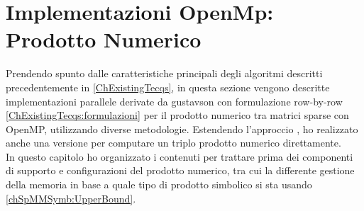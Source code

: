 \chapter{Implementazioni OpenMp: Prodotto Numerico}
\label{Chapter3}





Prendendo spunto dalle caratteristiche principali degli algoritmi descritti precedentemente in \ref{ChExistingTecqs}, 
in questa sezione vengono descritte implementazioni parallele derivate da gustavson \cite{gustavson} 
con formulazione row-by-row \ref{ChExistingTecqs:formulazioni} per il prodotto numerico tra matrici sparse con OpenMP, 
utilizzando diverse metodologie.
Estendendo l'approccio \rowbyrow, ho realizzato anche una versione per computare un triplo prodotto numerico direttamente.\\
In questo capitolo ho organizzato i contenuti per trattare prima dei componenti di supporto e configurazioni del prodotto numerico,
tra cui la differente gestione della memoria in base a quale tipo di prodotto simbolico si sta usando \ref{chSpMMSymb:UpperBound}.\\


